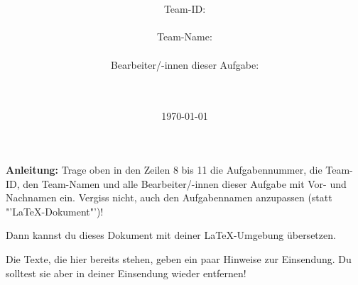 \documentclass[a4paper,10pt,ngerman]{scrartcl}
\title{\textbf{\Huge\Aufgabe}}
\author{\LARGE Team-ID: \LARGE \TeamId \\\\
\LARGE Team-Name: \LARGE \TeamName \\\\
\LARGE Bearbeiter/-innen dieser Aufgabe: \\
\LARGE \Namen\\\\}
\date{\LARGE\today}
\begin{document}
	\maketitle
	\tableofcontents

    \vspace{0.5cm}

	\textbf{Anleitung:} Trage oben in den Zeilen 8 bis 11 die Aufgabennummer, die Team-ID, den Team-Namen und alle Bearbeiter/-innen dieser Aufgabe mit Vor- und Nachnamen ein.
   		Vergiss nicht, auch den Aufgabennamen anzupassen (statt "'\LaTeX-Dokument"')!

    	Dann kannst du dieses Dokument mit deiner \LaTeX-Umgebung übersetzen.

    	Die Texte, die hier bereits stehen, geben ein paar Hinweise zur Einsendung.
   		Du solltest sie aber in deiner Einsendung wieder entfernen!
\end{document}
